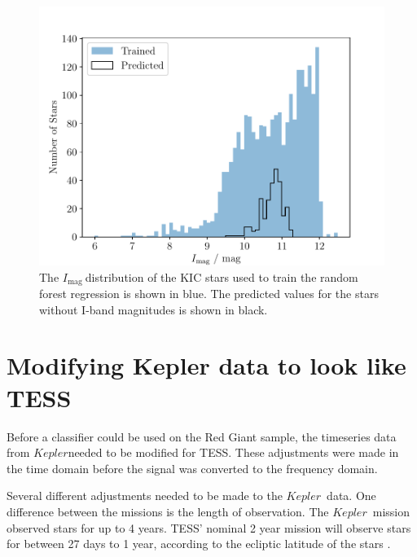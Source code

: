 \documentclass[a4paper,fleqn,usenatbib,useAMS]{mnras}
\newcommand{\kep}{\ensuremath{Kepler}\:}
\newcommand{\imag}{\ensuremath{I_{\textrm{mag}}\:}}
\begin{document}
\begin{figure}
	\centering
	\includegraphics[scale=0.5]{Plot3_Imag_trained_distribution_50kstars}
	\caption{The \imag distribution of the KIC stars used to train the random forest regression is shown in blue. The predicted values for the stars without I-band magnitudes is shown in black.}	
	\label{fig:imag train}
\end{figure}



\section{Modifying Kepler data to look like TESS}
\label{sect: tess-like}

Before a classifier could be used on the Red Giant sample, the timeseries data from \kep needed to be modified for TESS. These adjustments were made in the time domain before the signal was converted to the frequency domain.

Several different adjustments needed to be made to the \kep \ data. One difference between the missions is the length of observation. The \kep \ mission observed stars for up to 4 years. TESS' nominal 2 year mission will observe stars for between 27 days to 1 year, according to the ecliptic latitude of the stars \citep{ricker_transiting_2014}.
\end{document}
